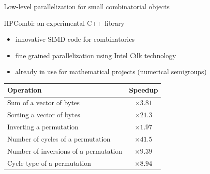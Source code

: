 \documentclass{beamer}
\begin{document}
\begin{frame}{Low-level parallelization for small combinatorial objects}

  \begin{block}{HPCombi: an experimental C++ library}
  \begin{itemize}
  \item innovative SIMD code for combinatorics
  \item fine grained parallelization using Intel Cilk technology
  \item already in use for mathematical projects (numerical semigroups)
  \end{itemize}
  \end{block}

  \begin{center}\begin{tabular}{l|c}
  Operation & Speedup \\\hline
  Sum of a vector of bytes & $\times 3.81$\\
  Sorting a vector of bytes& $\times 21.3$\\
  Inverting a permutation& $\times 1.97$\\
  Number of cycles of a permutation& $\times 41.5$\\
  Number of inversions of a permutation& $\times 9.39$\\
  Cycle type of a permutation& $\times 8.94$\\
  \end{tabular}\end{center}

\end{frame}
\end{document}
